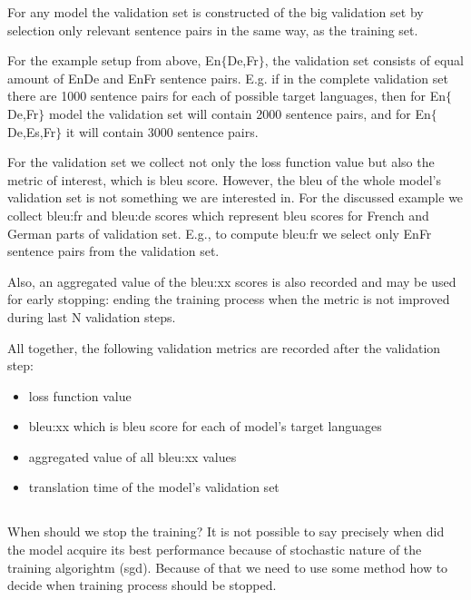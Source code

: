For any model the validation set is constructed of the big validation set
by selection only relevant sentence pairs in the same way, as the training set.

For the example setup from above, En\to{}$\{$De,Fr$\}$, the validation set
consists of equal amount of En\to{}De and En\to{}Fr sentence pairs.
E.g. if in the complete validation set there are 1000 sentence pairs for
each of possible target languages, then for En\to{}$\{$De,Fr$\}$
model the validation set will contain 2000 sentence pairs, and for
En\to{}$\{$De,Es,Fr$\}$ it will contain 3000 sentence pairs.

For the validation set we collect not only the loss function value
but also the metric of interest, which is \acrshort{bleu} score.
However, the \acrshort{bleu} of the whole model's validation set
is not something we are interested in.
For the discussed example we collect bleu:fr and bleu:de scores
which represent \acrshort{bleu} scores for French and German
parts of validation set.
E.g., to compute bleu:fr we select only En\to{}Fr sentence pairs from the
validation set.

Also, an aggregated value of the bleu:xx scores is also recorded
and may be used for early stopping: ending the training process
when the metric is not improved during last N validation steps.

\begin{samepage}
All together, the following validation metrics are recorded after the
validation step:
\begin{itemize}
	\item loss function value
	\item bleu:xx which is \acrshort{bleu} score for each of
	model's target languages
	\item aggregated value of all bleu:xx values
	\item translation time of the model's validation set
\end{itemize}
\end{samepage}

\subsection{}
\label{section:finishing-the-training}

When should we stop the training?
It is not possible to say precisely when did the model
acquire its best performance because of stochastic nature of
the training algorightm (\acrshort{sgd}).
Because of that we need to use some method how to decide when
training process should be stopped.


